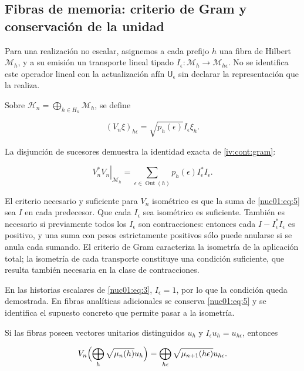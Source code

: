 \subsection{Fibras de memoria: criterio de Gram y conservación de la unidad}

Para una realización no escalar, asignemos a cada prefijo \(h\) una fibra de Hilbert \(\mathscr M_h\), y a su emisión un transporte lineal tipado
\(I_\epsilon:\mathscr M_h\to\mathscr M_{h\epsilon}\). No se identifica este operador lineal con la actualización afín \(\mathsf U_\epsilon\) sin declarar la representación que la realiza.

Sobre \(\mathscr H_n=\bigoplus_{h\in H_n}\mathscr M_h\), se define

\[
(V_n\xi)_{h\epsilon}=\sqrt{p_h(\epsilon)}I_\epsilon\xi_h.
\]

La disjunción de sucesores demuestra la identidad exacta de \cref{iv:cont:gram}:

\begin{equation}
\left.V_n^*V_n\right|_{\mathscr M_h}
=\sum_{\epsilon\in\operatorname{Out}(h)}p_h(\epsilon)I_\epsilon^*I_\epsilon.
\label{nuc01:eq:5}
\end{equation}

El criterio necesario y suficiente para \(V_n\) isométrico es que la suma de \eqref{nuc01:eq:5} sea \(I\) en cada predecesor. Que cada \(I_\epsilon\) sea isométrico es suficiente. También es necesario si previamente todos los \(I_\epsilon\) son contracciones: entonces cada \(I-I_\epsilon^*I_\epsilon\) es positivo, y una suma con pesos estrictamente positivos sólo puede anularse si se anula cada sumando. El criterio de Gram caracteriza la isometría de la aplicación total; la isometría de cada transporte constituye una condición suficiente, que resulta también necesaria en la clase de contracciones.

En las historias escalares de \eqref{nuc01:eq:3}, \(I_\epsilon=1\), por lo que la condición queda demostrada. En fibras analíticas adicionales se conserva \eqref{nuc01:eq:5} y se identifica el supuesto concreto que permite pasar a la isometría.

Si las fibras poseen vectores unitarios distinguidos \(u_h\) y \(I_\epsilon u_h=u_{h\epsilon}\), entonces

\begin{equation}
V_n\Bigl(\bigoplus_h\sqrt{\mu_n(h)}u_h\Bigr)
=\bigoplus_{h\epsilon}\sqrt{\mu_{n+1}(h\epsilon)}u_{h\epsilon}.
\label{nuc01:eq:6}
\end{equation}

